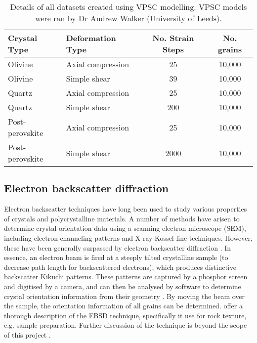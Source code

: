 \documentclass[a4paper,12pt,twoside]{report}
\numberwithin{equation}{chapter}
\begin{document}
\begin{table} 
	\centering
	\caption[VPSC datasets]{Details of all datasets created using VPSC modelling. VPSC models were ran by Dr Andrew Walker (University of Leeds).\\}
\begin{tabularx}{\textwidth}{X X c c}
	\hline
	\hline
	Crystal Type    & Deformation Type  & No. Strain Steps & No. grains \\
	\hline
	\hline
	Olivine         & Axial compression & 25   & 10,000 \\
	Olivine         & Simple shear      & 39   & 10,000 \\
	Quartz          & Axial compression & 25   & 10,000 \\
	Quartz          & Simple shear      & 200  & 10,000 \\
	Post-perovskite & Axial compression & 25   & 10,000 \\
	Post-perovskite & Simple shear      & 2000 & 10,000 \\
	\hline
	\end{tabularx}
\label{tab:VPSC_data}
\end{table}

\subsection{Electron backscatter diffraction}
Electron backscatter techniques have long been used to study various properties of crystals and polycrystalline materials. A number of methods have arisen to determine crystal orientation data using a scanning electron microscope (SEM), including electron channeling patterns and X-ray Kossel-line techniques. However, these have been generally surpassed by electron backscatter diffraction \citep[EBSD or backscatter Kikuchi diffraction,][]{Harland1973}.  In essence, an electron beam is fired at a steeply tilted crystalline sample (to decrease path length for backscattered electrons), which produces distinctive backscatter Kikuchi patterns. These patterns are captured by a phosphor screen and digitised by a camera, and can then be analysed by software to determine crystal orientation information from their geometry  \citep{Zaefferer2007}. By moving the beam over the sample, the orientation information of all grains can be determined. \cite{Prior1999} offer a thorough description of the EBSD technique, specifically it use for rock texture, e.g. sample preparation. Further discussion of the technique is beyond the scope of this project \citep[see][for more info]{Schwarzer1997,Randle2000}.    
\end{document}
